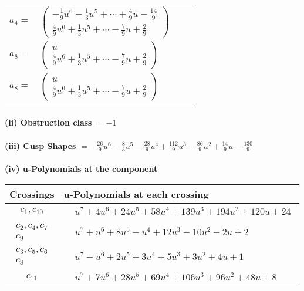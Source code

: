 \documentclass[1p]{elsarticle_modified}
\theoremstyle{definition}
\begin{document}
\begin{tabular}{m{7pt} m{180pt} m{7pt} m{180pt} }
\flushright $a_{4}=$&$\begin{pmatrix}-\frac{1}{9} u^6-\frac{1}{3} u^5+\cdots+\frac{4}{9} u-\frac{14}{9}\\\frac{4}{9} u^6+\frac{1}{3} u^5+\cdots-\frac{7}{9} u+\frac{2}{9}\end{pmatrix}$ \\
\flushright $a_{8}=$&$\begin{pmatrix}u\\\frac{4}{9} u^6+\frac{1}{3} u^5+\cdots-\frac{7}{9} u+\frac{2}{9}\end{pmatrix}$\\ \flushright $a_{8}=$&$\begin{pmatrix}u\\\frac{4}{9} u^6+\frac{1}{3} u^5+\cdots-\frac{7}{9} u+\frac{2}{9}\end{pmatrix}$\\&\end{tabular}
\flushleft \textbf{(ii) Obstruction class $= -1$}\\~\\
\flushleft \textbf{(iii) Cusp Shapes $= -\frac{26}{9} u^6-\frac{8}{3} u^5-\frac{28}{9} u^4+\frac{112}{9} u^3-\frac{86}{9} u^2+\frac{14}{9} u-\frac{130}{9}$}\\~\\
\newpage\renewcommand{\arraystretch}{1}
\flushleft \textbf{(iv) u-Polynomials at the component}\newline \\
\begin{tabular}{m{50pt}|m{274pt}}
Crossings & \hspace{64pt}u-Polynomials at each crossing \\
\hline $$\begin{aligned}c_{1},c_{10}\end{aligned}$$&$\begin{aligned}
&u^7+4 u^6+24 u^5+58 u^4+139 u^3+194 u^2+120 u+24
\end{aligned}$\\
\hline $$\begin{aligned}c_{2},c_{4},c_{7}\\c_{9}\end{aligned}$$&$\begin{aligned}
&u^7+u^6+8 u^5- u^4+12 u^3-10 u^2-2 u+2
\end{aligned}$\\
\hline $$\begin{aligned}c_{3},c_{5},c_{6}\\c_{8}\end{aligned}$$&$\begin{aligned}
&u^7- u^6+2 u^5+3 u^4+5 u^3+3 u^2+4 u+1
\end{aligned}$\\
\hline $$\begin{aligned}c_{11}\end{aligned}$$&$\begin{aligned}
&u^7+7 u^6+28 u^5+69 u^4+106 u^3+96 u^2+48 u+8
\end{aligned}$\\
\hline
\end{tabular}\\~\\
\end{document}
